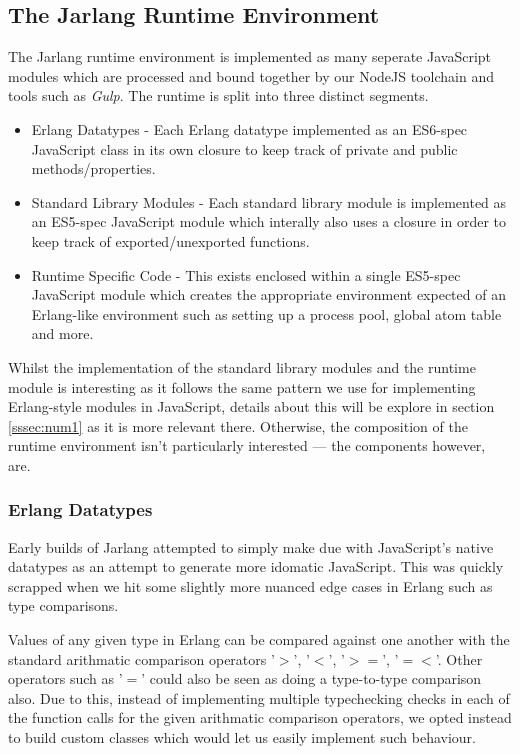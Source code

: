 \documentclass[twoside,12pt,titlepage,a4paper]{article}
\begin{document}
\subsection{The Jarlang Runtime Environment}
The Jarlang runtime environment is implemented as many seperate JavaScript modules which are processed and bound together by our NodeJS toolchain and tools such as \textit{Gulp}. The runtime is split into three distinct segments.

\begin{itemize}
	\item Erlang Datatypes - Each Erlang datatype implemented as an ES6-spec JavaScript class in its own closure to keep track of private and public methods/properties.
	\item Standard Library Modules - Each standard library module is implemented as an ES5-spec JavaScript module which interally also uses a closure in order to keep track of exported/unexported functions.
	\item Runtime Specific Code - This exists enclosed within a single ES5-spec JavaScript module which creates the appropriate environment expected of an Erlang-like environment such as setting up a process pool, global atom table and more.
\end{itemize}

Whilst the implementation of the standard library modules and the runtime module is interesting as it follows the same pattern we use for implementing Erlang-style modules in JavaScript, details about this will be explore in section \ref{sssec:num1} as it is more relevant there. Otherwise, the composition of the runtime environment isn't particularly interested --- the components however, are.

\subsubsection{Erlang Datatypes}
Early builds of Jarlang attempted to simply make due with JavaScript's native datatypes as an attempt to generate more idomatic JavaScript. This was quickly scrapped when we hit some slightly more nuanced edge cases in Erlang such as type comparisons.

Values of any given type in Erlang can be compared against one another with the standard arithmatic comparison operators '$>$', '$<$', '$>=$', '$=<$'. Other operators such as '$=$' could also be seen as doing a type-to-type comparison also. Due to this, instead of implementing multiple typechecking checks in each of the function calls for the given arithmatic comparison operators, we opted instead to build custom classes which would let us easily implement such behaviour.
\end{document}
